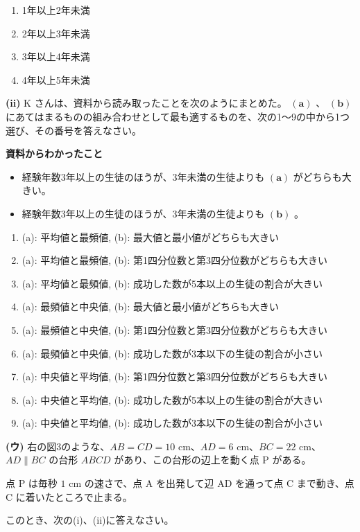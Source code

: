 \documentclass{ltjsarticle}
\begin{document}
\begin{enumerate}
    \item 1年以上2年未満
    \item 2年以上3年未満
    \item 3年以上4年未満
    \item 4年以上5年未満
\end{enumerate}

\textbf{(ii)}
K さんは、資料から読み取ったことを次のようにまとめた。 $\mathbf{(a)}$ 、 $\mathbf{(b)}$ にあてはまるものの組み合わせとして最も適するものを、次の1～9の中から1つ選び、その番号を答えなさい。

\textbf{資料からわかったこと}
\begin{itemize}
    \item 経験年数3年以上の生徒のほうが、3年未満の生徒よりも $\mathbf{(a)}$ がどちらも大きい。
    \item 経験年数3年以上の生徒のほうが、3年未満の生徒よりも $\mathbf{(b)}$ 。
\end{itemize}

\begin{enumerate}
  \item (a): 平均値と最頻値, (b): 最大値と最小値がどちらも大きい
  \item (a): 平均値と最頻値, (b): 第1四分位数と第3四分位数がどちらも大きい
  \item (a): 平均値と最頻値, (b): 成功した数が5本以上の生徒の割合が大きい
  \item (a): 最頻値と中央値, (b): 最大値と最小値がどちらも大きい
  \item (a): 最頻値と中央値, (b): 第1四分位数と第3四分位数がどちらも大きい
  \item (a): 最頻値と中央値, (b): 成功した数が3本以下の生徒の割合が小さい
  \item (a): 中央値と平均値, (b): 第1四分位数と第3四分位数がどちらも大きい
  \item (a): 中央値と平均値, (b): 成功した数が5本以上の生徒の割合が大きい
  \item (a): 中央値と平均値, (b): 成功した数が3本以下の生徒の割合が小さい
\end{enumerate}

\textbf{(ウ)}
右の図3のような、$AB = CD = 10$ cm、$AD = 6$ cm、$BC = 22$ cm、$AD \parallel BC$ の台形 $ABCD$ があり、この台形の辺上を動く点 P がある。

点 P は毎秒 $1$ cm の速さで、点 A を出発して辺 AD を通って点 C まで動き、点 C に着いたところで止まる。

このとき、次の(i)、(ii)に答えなさい。
\end{document}
